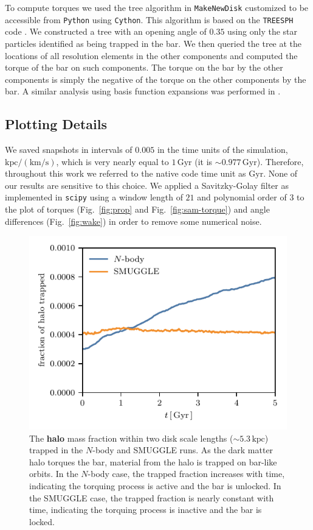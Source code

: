 \documentclass[twocolumn,linenumbers,trackchanges]{aastex631}
\newcommand{\Nbody}{$N$-body}
\newcommand{\SMUGGLE}{SMUGGLE}
\begin{document}
To compute torques we used the tree algorithm in \texttt{MakeNewDisk}
\citep{2005MNRAS.361..776S} customized to be accessible from \texttt{Python}
using \texttt{Cython}. This algorithm is based on the \texttt{TREESPH} code
\citep{1989ApJS...70..419H}. We constructed a tree with an opening angle of
$0.35$ using only the star particles identified as being trapped in the bar. We
then queried the tree at the locations of all resolution elements in the other
components and computed the torque of the bar on such components. The torque on
the bar by the other components is simply the negative of the torque on the
other components by the bar. A similar analysis using basis function expansions
was performed in \citet{2019MNRAS.490.3616P}.

\subsection{Plotting Details}
We saved snapshots in intervals of $0.005$ in the time units of the simulation,
$\textrm{kpc}/(\textrm{km}/\textrm{s})$, which is very nearly equal to
$1\,\textrm{Gyr}$ (it is $\sim0.977\,\textrm{Gyr}$). Therefore, throughout this
work we referred to the native code time unit as $\textrm{Gyr}$. None of our
results are sensitive to this choice. We applied a Savitzky-Golay filter
\citep{1964AnaCh..36.1627S} as implemented in \texttt{scipy} using a window
length of $21$ and polynomial order of $3$ to the plot of torques
(Fig.~\ref{fig:prop} and Fig.~\ref{fig:sam-torque}) and angle differences
(Fig.~\ref{fig:wake}) in order to remove some numerical noise.

\begin{figure}
    \centering
    \includegraphics[width=\columnwidth]{fig/halo_trapped.pdf}
    \caption{The {\bf halo} mass fraction within two disk scale lengths
    ($\sim5.3\,\textrm{kpc}$) trapped in the \Nbody{} and \SMUGGLE{} runs. As
    the dark matter halo torques the bar, material from the halo is trapped on
    bar-like orbits. In the \Nbody{} case, the trapped fraction increases with
    time, indicating the torquing process is active and the bar is unlocked. In
    the \SMUGGLE{} case, the trapped fraction is nearly constant with time,
    indicating the torquing process is inactive and the bar is locked.}
    \label{fig:htrap}
\end{figure}
\end{document}
